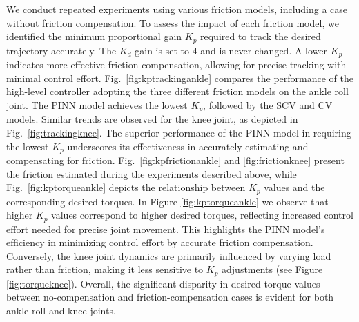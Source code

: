 We conduct repeated experiments using various friction models, including a case without friction compensation. To assess the impact of each friction model, we identified the minimum proportional gain $K_p$ required to track the desired trajectory accurately. The $K_d$ gain is set to $4$ and is never changed.  A lower $K_p$ indicates more effective friction compensation, allowing for precise tracking with minimal control effort. Fig.~\ref{fig:kptrackingankle} compares the performance of the high-level controller adopting the three different friction models on the ankle roll joint. The PINN model achieves the lowest $K_p$, followed by the SCV and CV models. Similar trends are observed for the knee joint, as depicted in Fig.~\ref{fig:trackingknee}. The superior performance of the PINN model in requiring the lowest $K_p$ underscores its effectiveness in accurately estimating and compensating for friction. Fig.~\ref{fig:kpfrictionankle} and \ref{fig:frictionknee} present the friction estimated during the experiments described above, while Fig.~\ref{fig:kptorqueankle} depicts the relationship between $K_p$ values and the corresponding desired torques. In Figure \ref{fig:kptorqueankle} we observe that higher $K_p$ values correspond to higher desired torques, reflecting increased control effort needed for precise joint movement. This highlights the PINN model's efficiency in minimizing control effort by accurate friction compensation. Conversely, the knee joint dynamics are primarily influenced by varying load rather than friction, making it less sensitive to $K_p$ adjustments (see Figure \ref{fig:torqueknee}). Overall, the significant disparity in desired torque values between no-compensation and friction-compensation cases is evident for both ankle roll and knee joints.

